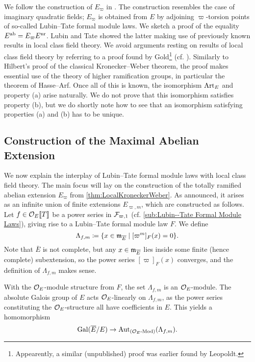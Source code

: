 \documentclass[../main.tex]{subfiles}
\begin{document}
We follow the construction of $E_\varpi$ in \cite{LubinTateFormalMult}.
The construction resembles the case of imaginary quadratic fields; $E_\varpi$ is
obtained from $E$ by adjoining $\varpi$-torsion points of so-called Lubin--Tate
formal module laws. 
We sketch a proof of the equality $E^{\mathrm{ab}} = E_\varpi E^{\mathrm{nr}}$. Lubin and Tate
showed the latter
making use of previously known results in local class field theory.
We avoid arguments resting on results of local class field theory
by referring to a proof found by Gold\footnote{Appearently, a similar
(unpublished) proof was earlier found by Leopoldt.} (cf. \cite{gold1981local}).
Similarly to Hilbert's proof of the classical Kronecker--Weber theorem,
the proof makes essential use of the theory of higher ramification groups,
in particular the theorem of Hasse--Arf. 
Once all of this is known, the isomorphism $\operatorname{Art}_E$ and property
(a) arise naturally. We do not prove that this isomorphism satisfies property
(b), but we do shortly note how to see that an isomorphism satisfying properties
(a) and (b) has to be unique.


\subsection{Construction of the Maximal Abelian Extension} %
\label{sub:Construction of the Maximal Abelian Extension}
We now explain the interplay of Lubin--Tate formal module laws with 
local class field theory. The main focus will lay on the construction of the
totally ramified abelian extension $E_\varpi$ from
\cref{thm:LocalKroneckerWeber}. As announced, it 
arises as an infinite union of finite extensions $E_{\varpi, m}$, which
are constructed as follows. Let $f \in \mathcal{O}_E\llbracket T \rrbracket$ be a power series
in $\mathcal{F}_{\varpi,1}$ (cf. \cref{sub:Lubin--Tate Formal Module Laws}), giving rise to a
Lubin--Tate formal module law $F$. We define
\begin{equation*}
  \Lambda_{f,m} \coloneqq \{x \in \mathfrak{m}_{\overline E} \mid [\varpi^m]_F(x) = 0\}.
\end{equation*}
Note that $\bar E$ is not complete, but any $x \in \mathfrak{m}_{\overline E}$ lies inside
some finite (hence
complete) subextension, so the power series $[\varpi]_F(x)$ converges, and the 
definition of $\Lambda_{f,m}$ makes sense.

With the $\mathcal{O}_E$-module structure from $F$, the set $\Lambda_{f,m}$ is an
$\mathcal{O}_E$-module. The absolute Galois group of $E$ acts $\mathcal{O}_E$-linearly on
$\Lambda_{f,m}$, as the power series constituting the $\mathcal{O}_E$-structure all
have coefficients in $E$. This yields a homomorphism 
\begin{equation} \label{eq:GaloisGroupToLambdaHom}
  \operatorname{Gal}(\overline E /E ) \to \operatorname{Aut}_{{({\mathcal{O}_E}\textnormal-\allowbreak\mathrm{Mod})}}(\Lambda_{f,m}).
\end{equation}
\end{document}
